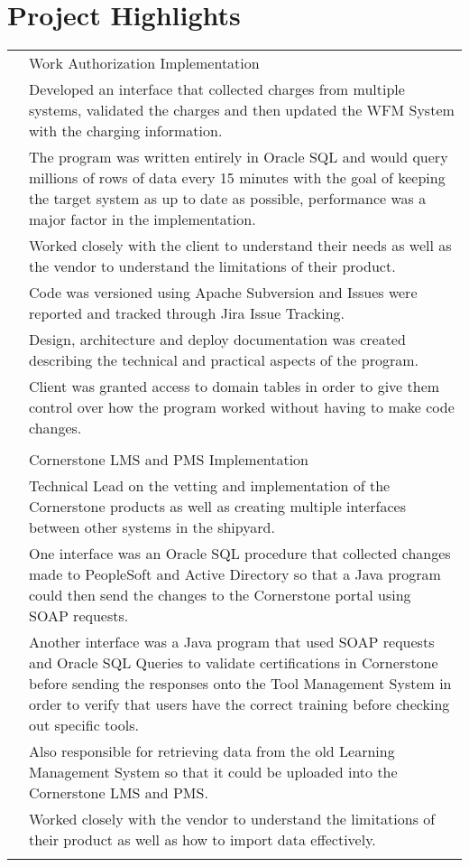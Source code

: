 \documentclass[12pt]{article}
\begin{document}
\section*{\selectfont Project Highlights}
\begin{tabular}{p{2.3cm}|p{15.4cm}}
	\centering 2018 & Work Authorization Implementation\\&\small{Developed an interface that collected charges from multiple systems, validated the charges and then updated the WFM System with the charging information.}\\&\small{The program was written entirely in Oracle SQL and would query millions of rows of data every 15 minutes with the goal of keeping the target system as up to date as possible, performance was a major factor in the implementation.}\\&\small{Worked closely with the client to understand their needs as well as the vendor to understand the limitations of their product.}\\&\small{Code was versioned using Apache Subversion and Issues were reported and tracked through Jira Issue Tracking.}\\&\small{Design, architecture and deploy documentation was created describing the technical and practical aspects of the program.}\\&\small{Client was granted access to domain tables in order to give them control over how the program worked without having to make code changes.}\\\multicolumn{2}{c}{} \\
	\centering 2017 & Cornerstone LMS and PMS Implementation\\&\small{Technical Lead on the vetting and implementation of the Cornerstone products as well as creating multiple interfaces between other systems in the shipyard.}\\&\small{One interface was an Oracle SQL procedure that collected changes made to PeopleSoft and Active Directory so that a Java program could then send the changes to the Cornerstone portal using SOAP requests.}\\&\small{Another interface was a Java program that used SOAP requests and Oracle SQL Queries to validate certifications in Cornerstone before sending the responses onto the Tool Management System in order to verify that users have the correct training before checking out specific tools.}\\&\small{Also responsible for retrieving data from the old Learning Management System so that it could be uploaded into the Cornerstone LMS and PMS.}\\&\small{Worked closely with the vendor to understand the limitations of their product as well as how to import data effectively.}\\\multicolumn{2}{c}{} \\

\end{tabular}
\end{document}

